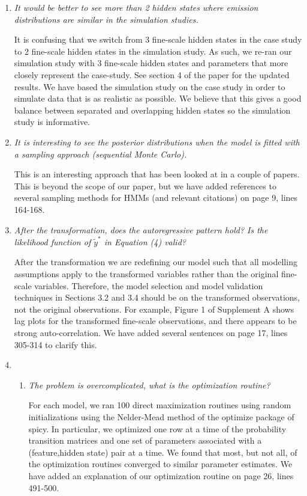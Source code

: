 \documentclass{article}
\begin{document}
\begin{enumerate}
\begin{enumerate}
    \end{enumerate}
    
    \item \textit{It would be better to see more than 2 hidden states where emission distributions are similar in the simulation studies.} 
    
    It is confusing that we switch from 3 fine-scale hidden states in the case study to 2 fine-scale hidden states in the simulation study. As such, we re-ran our simulation study with 3 fine-scale hidden states and parameters that more closely represent the case-study. See section 4 of the paper for the updated results.  We have based the simulation study on the case study in order to simulate data that is as realistic as possible. We believe that this gives a good balance between separated and overlapping hidden states so the simulation study is informative.
    
    \item \textit{It is interesting to see the posterior distributions when the model is fitted with a sampling approach (sequential Monte Carlo).} 
    
    This is an interesting approach that has been looked at in a couple of papers. This is beyond the scope of our paper, but we have added references to several sampling methods for HMMs (and relevant citations) on page 9, lines 164-168.
    
    \item \textit{After the transformation, does the autoregressive pattern hold? Is the likelihood function of $\tilde y^*$ in Equation (4) valid?} 
    
    After the transformation we are redefining our model such that all modelling assumptions apply to the transformed variables rather than the original fine-scale variables. Therefore, the model selection and model validation techniques in Sections 3.2 and 3.4 should be  on the transformed observations, not the original observations. For example, Figure 1 of Supplement A shows lag plots for the transformed fine-scale observations, and there appears to be strong auto-correlation. We have added several sentences on page 17, lines 305-314 to clarify this.
    
    \item \begin{enumerate}
        \item \textit{The problem is overcomplicated, what is the optimization routine? } 
        
        For each model, we ran 100 direct maximization routines using random initializations using the Nelder-Mead method of the optimize package of spicy. In particular, we optimized one row at a time of the probability transition matrices and one set of parameters associated with a (feature,hidden state) pair at a time. We found that most, but not all, of the optimization routines converged to similar parameter estimates. We have added an explanation of our optimization routine on page 26, lines 491-500.
        

\end{enumerate}
\end{enumerate}
\end{document}
